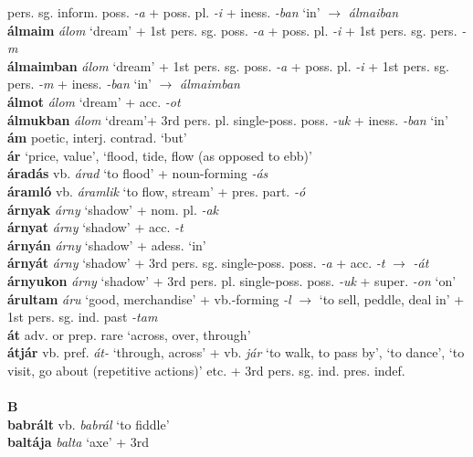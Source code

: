 \documentclass[11pt]{article}
\begin{document}
pers. sg. inform. poss. \emph{-a} + poss. pl. \emph{-i} +
iness. \emph{-ban} `in' $\rightarrow$ \emph{álmaiban} \\
\textbf{álmaim} \emph{álom} `dream' + 1st pers. sg. poss. \emph{-a} +
poss. pl. \emph{-i} + 1st pers. sg. pers. \emph{-m} \\
\textbf{álmaimban} \emph{álom} `dream' + 1st pers. sg. poss. \emph{-a}
+ poss. pl. \emph{-i} + 1st pers. sg. pers. \emph{-m} +
  iness. \emph{-ban} `in' $\rightarrow$ \emph{álmaimban} \\
\textbf{álmot} \emph{álom} `dream' + acc. \emph{-ot} \\
\textbf{álmukban} \emph{álom} `dream'+ 3rd
pers. pl. single\hyp{}poss. poss. \emph{-uk} + iness. \emph{-ban} `in' \\
\textbf{ám} poetic, interj. contrad. `but' \\
\textbf{ár} `price, value', `flood, tide, flow (as opposed to ebb)' \\
\textbf{áradás} vb. \emph{árad} `to flood' + noun\hyp{}forming \emph{-ás} \\
\textbf{áramló} vb. \emph{áramlik} `to flow, stream' + pres. part. \emph{-ó} \\
\textbf{árnyak} \emph{árny} `shadow' + nom. pl. \emph{-ak} \\
\textbf{árnyat} \emph{árny} `shadow' + acc. \emph{-t} \\
\textbf{árnyán} \emph{árny} `shadow' + adess. `in' \\
\textbf{árnyát} \emph{árny} `shadow' + 3rd
  pers. sg. single\hyp{}poss. poss. \emph{-a} + acc. \emph{-t} $\rightarrow$ \emph{-át} \\
\textbf{árnyukon} \emph{árny} `shadow' + 3rd
pers. pl. single\hyp{}poss. poss. \emph{-uk} + super. \emph{-on}
`on' \\
\textbf{árultam} \emph{áru} `good, merchandise' +
vb.\hyp{}forming \emph{-l} $\rightarrow$ `to sell, peddle, deal in' +
1st pers. sg. ind. past \emph{-tam} \\
\textbf{át} adv. or prep. rare `across, over, through' \\
\textbf{átjár} vb. pref. \emph{át-} `through, across' + vb. \emph{jár}
`to walk, to pass by', `to dance', `to visit, go about (repetitive
actions)' etc. + 3rd pers. sg. ind. pres. indef. \\
\ \\
\noindent \textbf{\large B} \\
\textbf{babrált} vb. \emph{babrál} `to fiddle' \\
\textbf{baltája} \emph{balta} `axe' + 3rd
\end{document}
